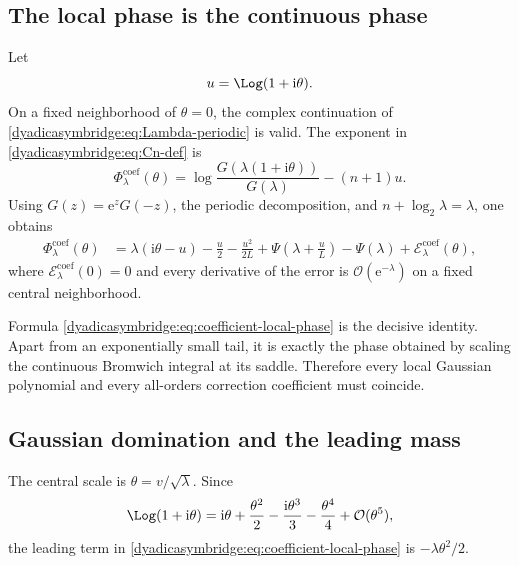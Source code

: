 \documentclass[11pt,oneside]{article}
\theoremstyle{definition}
\theoremstyle{remark}
\newcommand{\e}{\mathrm e}
\newcommand{\ii}{\mathrm i}
\newcommand{\bigO}{\mathcal O}
\begin{document}
\subsection{The local phase is the continuous phase}
\label{dyadicasymbridge:subsec:phase-identity}

Let
\begin{equation}
 u=\Log(1+\ii\theta).
\label{dyadicasymbridge:eq:u-def}
\end{equation}
On a fixed neighborhood of $\theta=0$, the complex continuation of
\eqref{dyadicasymbridge:eq:Lambda-periodic} is valid.  The exponent in \eqref{dyadicasymbridge:eq:Cn-def} is
\begin{equation}
 \Phi^{\mathrm{coef}}_\lambda(\theta)=
 \log\frac{G(\lambda(1+\ii\theta))}{G(\lambda)}-(n+1)u.
\label{dyadicasymbridge:eq:coef-phase-def}
\end{equation}
Using $G(z)=\e^zG(-z)$, the periodic decomposition, and
$n+\log_2\lambda=\lambda$, one obtains
\begin{align}
 \Phi^{\mathrm{coef}}_\lambda(\theta)
 &=\lambda(\ii\theta-u)-\frac u2-\frac{u^2}{2L}
 +\Psi\!\left(\lambda+\frac uL\right)-\Psi(\lambda)
 +\mathcal E^{\mathrm{coef}}_\lambda(\theta),
\label{dyadicasymbridge:eq:coefficient-local-phase}
\end{align}
where $\mathcal E^{\mathrm{coef}}_\lambda(0)=0$ and every derivative of the error is
$\bigO(\e^{-\lambda})$ on a fixed central neighborhood.

Formula \eqref{dyadicasymbridge:eq:coefficient-local-phase} is the decisive identity.  Apart from an exponentially small tail, it is exactly the phase obtained by scaling the continuous Bromwich integral at its saddle.  Therefore every local Gaussian polynomial and every all-orders correction coefficient must coincide.

\subsection{Gaussian domination and the leading mass}

The central scale is $\theta=v/\sqrt\lambda$.  Since
\begin{equation}
 \Log(1+\ii\theta)=
 \ii\theta+\frac{\theta^2}{2}-\frac{\ii\theta^3}{3}
 -\frac{\theta^4}{4}+\bigO(\theta^5),
\label{dyadicasymbridge:eq:log-expansion}
\end{equation}
the leading term in \eqref{dyadicasymbridge:eq:coefficient-local-phase} is
$-\lambda\theta^2/2$.
\end{document}
